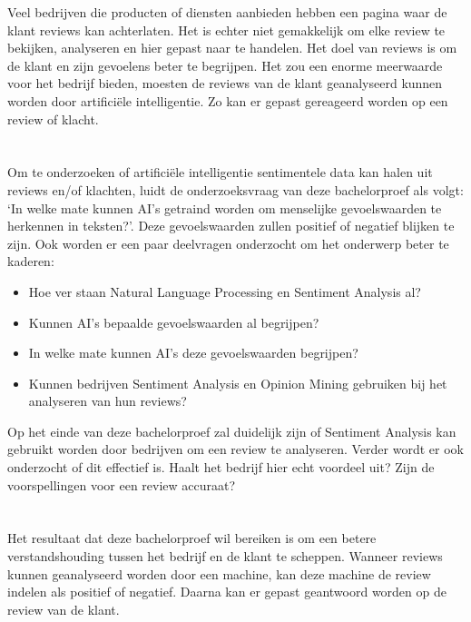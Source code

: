 Veel bedrijven die producten of diensten aanbieden hebben een pagina waar de klant reviews kan achterlaten. Het is echter niet gemakkelijk om elke review te bekijken, analyseren en hier gepast naar te handelen. Het doel van reviews is om de klant en zijn gevoelens beter te begrijpen. Het zou een enorme meerwaarde voor het bedrijf bieden, moesten de reviews van de klant geanalyseerd kunnen worden door artificiële intelligentie. Zo kan er gepast gereageerd worden op een review of klacht. 

\section{}
\label{sec:onderzoeksvraag}

Om te onderzoeken of artificiële intelligentie sentimentele data kan halen uit reviews en/of klachten, luidt de onderzoeksvraag van deze bachelorproef als volgt: `In welke mate kunnen AI’s getraind worden om menselijke gevoelswaarden te herkennen in teksten?'. Deze gevoelswaarden zullen positief of negatief blijken te zijn. Ook worden er een paar deelvragen onderzocht om het onderwerp beter te kaderen:

\begin{itemize}
    \item Hoe ver staan Natural Language Processing en Sentiment Analysis al?
    \item Kunnen AI's bepaalde gevoelswaarden al begrijpen?
    \item In welke mate kunnen AI's deze gevoelswaarden begrijpen?
    \item Kunnen bedrijven Sentiment Analysis en Opinion Mining gebruiken bij het analyseren van hun reviews?
\end{itemize}

Op het einde van deze bachelorproef zal duidelijk zijn of Sentiment Analysis kan gebruikt worden door bedrijven om een review te analyseren. Verder wordt er ook onderzocht of dit effectief is. Haalt het bedrijf hier echt voordeel uit? Zijn de voorspellingen voor een review accuraat?


\section{}
\label{sec:onderzoeksdoelstelling}

Het resultaat dat deze bachelorproef wil bereiken is om een betere verstandshouding tussen het bedrijf en de klant te scheppen. Wanneer reviews kunnen geanalyseerd worden door een machine, kan deze machine de review indelen als positief of negatief. Daarna kan er gepast geantwoord worden op de review van de klant. 

